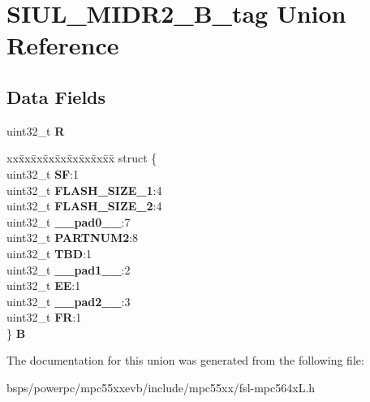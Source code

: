 \hypertarget{unionSIUL__MIDR2__32B__tag}{}\section{S\+I\+U\+L\+\_\+\+M\+I\+D\+R2\+\_\+B\+\_\+tag Union Reference}
\label{unionSIUL__MIDR2__32B__tag}
\subsection*{Data Fields}
\begin{DoxyCompactItemize}
\item 
\mbox{\label{unionSIUL__MIDR2__32B__tag_a05b14b962da565528f86bd88fd144dd9}} 
uint32\+\_\+t {\bfseries R}
\item 
\mbox{\label{unionSIUL__MIDR2__32B__tag_a7f656648b2e7c66ade90a29026b47010}} 
\begin{tabbing}
xx\=xx\=xx\=xx\=xx\=xx\=xx\=xx\=xx\=\kill
struct \{\\
\>uint32\_t {\bfseries SF}:1\\
\>uint32\_t {\bfseries FLASH\_SIZE\_1}:4\\
\>uint32\_t {\bfseries FLASH\_SIZE\_2}:4\\
\>uint32\_t {\bfseries \_\_pad0\_\_}:7\\
\>uint32\_t {\bfseries PARTNUM2}:8\\
\>uint32\_t {\bfseries TBD}:1\\
\>uint32\_t {\bfseries \_\_pad1\_\_}:2\\
\>uint32\_t {\bfseries EE}:1\\
\>uint32\_t {\bfseries \_\_pad2\_\_}:3\\
\>uint32\_t {\bfseries FR}:1\\
\} {\bfseries B}\\

\end{tabbing}\end{DoxyCompactItemize}


The documentation for this union was generated from the following file\+:\begin{DoxyCompactItemize}
\item 
bsps/powerpc/mpc55xxevb/include/mpc55xx/fsl-\/mpc564x\+L.\+h\end{DoxyCompactItemize}
